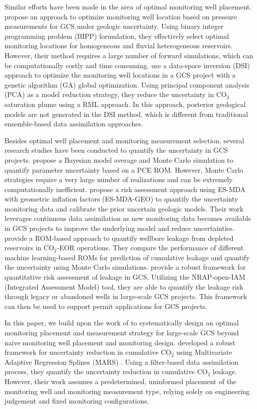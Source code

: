 \documentclass[a4paper,fleqn]{cas-sc}
\begin{document}
Similar efforts have been made in the area of optimal monitoring well placement. \citet{Sun2013} propose an approach to optimize monitoring well location based on pressure measurements for GCS under geologic uncertainty. Using binary integer programming problem (BIPP) formulation, they effectively select optimal monitoring locations for homogeneous and fluvial heterogeneous reservoirs. However, their method requires a large number of forward simulations, which can be computationally costly and time consuming. \citet{Sun2019} use a data-space inversion (DSI) approach to optimize the monitoring well locations in a GCS project with a genetic algorithm (GA) global optimization. Using principal component analysis (PCA) as a model reduction strategy, they reduce the uncertainty in CO$_2$ saturation plume using a RML approach. In this approach, posterior geological models are not generated in the DSI method, which is different from traditional ensemble-based data assimilation approaches. 

Besides optimal well placement and monitoring measurement selection, several research studies have been conducted to quantify the uncertainty in GCS projects. \citet{Jia2018104} propose a Bayesian model average and Monte Carlo simulation to quantify parameter uncertainty based on a PCE ROM. However, Monte Carlo strategies require a very large number of realizations and can be extremely computationally inefficient. \citet{Chen2020} propose a risk assessment approach using ES-MDA with geometric inflation factors (ES-MDA-GEO) to quantify the uncertainty monitoring data and calibrate the prior uncertain geologic models. Their work leverages continuous data assimilation as new monitoring data becomes available in GCS projects to improve the underlying model and reduce uncertainties. \citet{Mehana2022} provide a ROM-based approach to quantify wellbore leakage from depleted reservoirs in CO$_2$-EOR operations. They compare the performance of different machine learning-based ROMs for prediction of cumulative leakage and quantify the uncertainty using Monte Carlo simulations. \citet{Pawar2022} provide a robust framework for quantitative risk assessment of leakage in GCS. Utilizing the NRAP-open-IAM (Integrated Assessment Model) tool, they are able to quantify the leakage risk through legacy or abandoned wells in large-scale GCS projects. This framework can then be used to support permit applications for GCS projects. 

In this paper, we build upon the work of \citet{Chen2018} to systematically design an optimal monitoring placement and measurement strategy for large-scale GCS beyond naive monitoring well placement and monitoring design. \citet{Chen2018} developed a robust framework for uncertainty reduction in cumulative CO$_2$ using Multivariate Adaptive Regression Splines (MARS) \citep{Friedman19911}. Using a filter-based data assimilation process, they quantify the uncertainty reduction in cumulative CO$_2$ leakage. However, their work assumes a predetermined, uninformed placement of the monitoring well and monitoring measurement type, relying solely on engineering judgement and fixed monitoring configurations.
\end{document}

